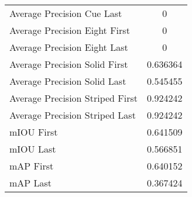\begin{figure}
\begin{subfigure}[b]{0.49\textwidth}
\begin{tabular}{|l|c|}
        Average Precision Cue Last & 0 \\
        Average Precision Eight First & 0 \\
        Average Precision Eight Last & 0 \\
        Average Precision Solid First & 0.636364 \\
        Average Precision Solid Last & 0.545455 \\
        Average Precision Striped First & 0.924242 \\
        Average Precision Striped Last & 0.924242 \\
        \hline
        mIOU First & 0.641509 \\
        mIOU Last & 0.566851 \\
        mAP First & 0.640152 \\
        mAP Last & 0.367424 \\
        \hline
    \end{tabular}    
\end{subfigure}
\end{figure}


